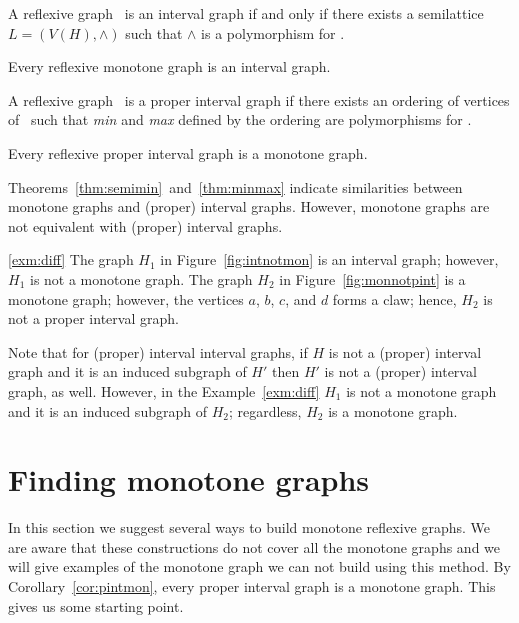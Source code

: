 \begin{theorem}[TODO] \label{thm:semimin}
A reflexive graph \mH\ is an interval graph if and only if there exists
a semilattice \(L=(V(H), \wedge)\) such that \(\wedge\) is a polymorphism for \mH\@.
\end{theorem}

\begin{cor} \label{cor:intmon}
Every reflexive monotone graph is an interval graph.
\end{cor}

\begin{theorem} [TODO] \label{thm:minmax}
A reflexive graph \mH\ is a proper interval graph if there exists an ordering of 
vertices of \mH\ such that \emph{min} and \emph{max} defined by the ordering are
polymorphisms for \mH\@.
\end{theorem}

\begin{cor} \label{cor:pintmon}
Every reflexive proper interval graph is a monotone graph.
\end{cor}

Theorems~\ref{thm:semimin}~and~\ref{thm:minmax} indicate similarities between
monotone graphs and (proper) interval graphs. However, monotone graphs are not
equivalent with (proper) interval graphs.

\begin{example} \ref{exm:diff}
The graph \(H_1\) in Figure~\ref{fig:intnotmon} is 
an interval graph; however, \(H_1\) is not a monotone graph.
The graph \(H_2\) in Figure~\ref{fig:monnotpint} is a monotone graph;
however, the vertices \(a\), \(b\), \(c\), and \(d\) forms a claw; hence,
\(H_2\) is not a proper interval graph. 

\begin{figure}[h]
\hfill
\subfigure[\ensuremath{H_1}]{\label{fig:intnotmon}}\hfill 
\subfigure[\ensuremath{H_2}]{\label{fig:monnotpint}}\hfill 
\end{figure}
\end{example}


Note that for (proper) interval interval graphs, if \(H\) is not a (proper) interval graph
and it is an induced subgraph of \(H'\) then \(H'\) is not a (proper) interval graph, as well.
However, in the Example~\ref{exm:diff} \(H_1\) is not a monotone graph and it is an induced 
subgraph of \(H_2\); regardless, \(H_2\) is a monotone graph.

\section{Finding monotone graphs}
In this section we suggest several ways to build monotone reflexive graphs. We are aware that
these constructions do not cover all the monotone graphs and we will 
give examples of the monotone graph we can not build using this method.
By Corollary~\ref{cor:pintmon}, every proper interval graph is a monotone graph.
This gives us some starting point.

